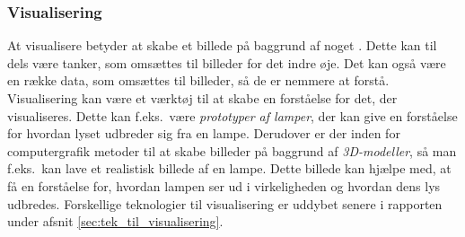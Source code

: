 \subsubsection{Visualisering}
At visualisere betyder at skabe et billede på baggrund af noget \cite{ddo_visualisering}. Dette kan til dels være tanker, som omsættes til billeder for det indre øje. Det kan også være en række data, som omsættes til billeder, så de er nemmere at forstå.
Visualisering kan være et værktøj til at skabe en forståelse for det, der visualiseres. Dette kan f.eks.\ være \textit{prototyper af lamper}, der kan give en forståelse for hvordan lyset udbreder sig fra en lampe. Derudover er der inden for computergrafik metoder til at skabe billeder på baggrund af \textit{3D-modeller}, så man f.eks.\ kan lave et realistisk billede af en lampe. Dette billede kan hjælpe med, at få en forståelse for, hvordan lampen ser ud i virkeligheden og hvordan dens lys udbredes. Forskellige teknologier til visualisering er uddybet senere i rapporten under afsnit \ref{sec:tek_til_visualisering}. 
